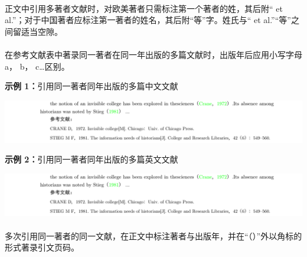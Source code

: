 \documentclass[twoside]{article}%
\begin{document}
\paragraph{} 正文中引用多著者文献时，对欧美著者只需标注第一个著者的姓，其后附“ et al.”；对于中国著者应标注第一著者的姓名，其后附“等”字。姓氏与“ et al.”“等”之间留适当空隙。

\paragraph{} 在参考文献表中著录同一著者在同一年出版的多篇文献时，出版年后应用小写字母 a， b， c…区别。

\textbf{示例 1：}引用同一著者同年出版的多篇中文文献

\noindent\hspace{-2.5cm}\includegraphics[width=\paperwidth,page=2]{tngbcitationaynew.pdf}
%

\textbf{示例 2：}引用同一著者同年出版的多篇英文文献

\noindent\hspace{-2.5cm}\includegraphics[width=\paperwidth,page=3]{tngbcitationaynew.pdf}

%


\paragraph{}\label{sec:ay:multicites} 多次引用同一著者的同一文献，在正文中标注著者与出版年，并在“（）”外以角标的形式著录引文页码。
\end{document}
